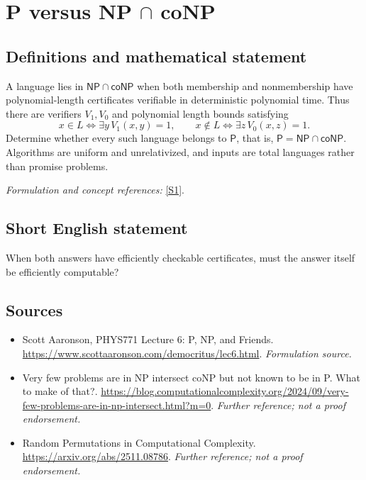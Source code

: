 \documentclass[11pt]{article}
\begin{document}
\section*{\texorpdfstring{P versus NP \ensuremath{\cap} coNP}{P versus NP ∩ coNP}}\label{34}
\subsection{Definitions and mathematical statement}
A language lies in $\mathsf{NP}\cap\mathsf{coNP}$ when both membership and nonmembership have polynomial-length certificates verifiable in deterministic polynomial time. Thus there are verifiers $V_1,V_0$ and polynomial length bounds satisfying
\[
 x\in L\iff\exists y\,V_1(x,y)=1,\qquad
 x\notin L\iff\exists z\,V_0(x,z)=1.
\]
Determine whether every such language belongs to $\mathsf P$, that is, $\mathsf P=\mathsf{NP}\cap\mathsf{coNP}$. Algorithms are uniform and unrelativized, and inputs are total languages rather than promise problems.
\par\smallskip\textit{Formulation and concept references:} \href{https://www.scottaaronson.com/democritus/lec6.html}{[S1]}.

\subsection{Short English statement}
When both answers have efficiently checkable certificates, must the answer itself be efficiently computable?
\subsection{Sources}
\begin{itemize}
\item[S1]Scott Aaronson, PHYS771 Lecture 6: P, NP, and Friends.
\url{https://www.scottaaronson.com/democritus/lec6.html}.
\textit{Formulation source.}
\item[S2]Very few problems are in NP intersect coNP but not known to be in P. What to make of that?.
\url{https://blog.computationalcomplexity.org/2024/09/very-few-problems-are-in-np-intersect.html?m=0}.
\textit{Further reference; not a proof endorsement.}
\item[S3]Random Permutations in Computational Complexity.
\url{https://arxiv.org/abs/2511.08786}.
\textit{Further reference; not a proof endorsement.}
\end{itemize}
\end{document}
